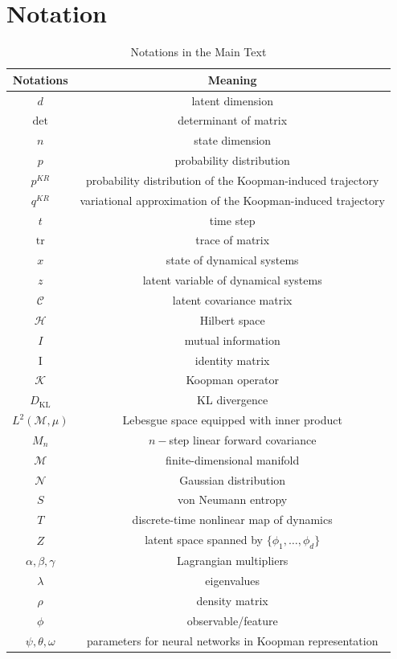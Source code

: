 \documentclass{article} %
\begin{document}
\section{Notation} \label{append:notation}
\begin{table}[h]
\begin{center}
\caption{Notations in the Main Text}
\begin{tabular}{cc}
\toprule     
Notations & Meaning   \\ 
\midrule %
$d$ & latent dimension \\ 
$\det$ & determinant of matrix \\ 
$n$ & state dimension \\
$p$ & probability distribution \\ 
$p^{KR}$ & probability distribution of the Koopman-induced trajectory \\ 
$q^{KR}$ & variational approximation of the Koopman-induced trajectory \\ 
$t$ & time step \\ 
$\mathrm{tr}$ & trace of matrix \\ 
$x$ & state of dynamical systems \\ 
$z$ & latent variable of dynamical systems \\ 
$\mathcal{C}$ & latent covariance matrix \\ 
$\mathcal{H}$ & Hilbert space \\ 
$I$ & mutual information \\ 
$\mathrm{I}$ & identity matrix \\ 
$\mathcal{K}$ & Koopman operator \\
$D_{\mathrm{KL}}$ & KL divergence \\ 
$L^2(\mathcal{M},\mu)$ & Lebesgue space equipped with inner product \\
$M_n$ & $n-$step linear forward covariance \\ 
$\mathcal{M}$ & finite-dimensional manifold \\
$\mathcal{N}$ & Gaussian distribution \\
$S$ & von Neumann entropy \\ 
$T$ & discrete-time nonlinear map of dynamics \\ 
$Z$ & latent space spanned by $\{ \phi_1, \dots, \phi_d \}$ \\ 
$\alpha, \beta, \gamma$ & Lagrangian multipliers \\ 
$\lambda$ & eigenvalues \\
$\rho$ & density matrix \\
$\phi$ & observable/feature \\ 
$\psi, \theta, \omega$ & parameters for neural networks in Koopman representation \\
\toprule 
\end{tabular}
\end{center}
\end{table}
\end{document}
